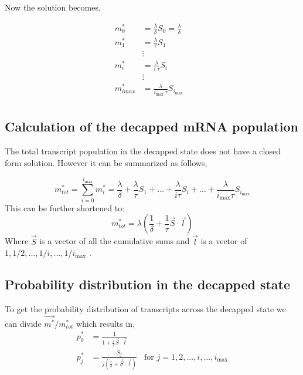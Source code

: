 \documentclass[review]{elsarticle}
\newcommand{\imax}{\ensuremath{i_{\max}}\xspace}
\begin{document}
Now the solution becomes,

\begin{align} \label{eq:decapped_solution} 
m_{0}^{*}  &= \frac{\lambda}{\delta}S_{0}=\frac{\lambda}{\delta} \\ \nonumber
m_{1}^{*}  &= \frac{\lambda}{\tau}S_{1} \\ \nonumber
& \vdots & \\ \nonumber
m_{i}^{*}  &= \frac{\lambda}{i \: \tau}S_{i}  \\ \nonumber
& \vdots & \\ \nonumber
m_{imax}^{*}  &= \frac{\lambda}{\imax \: \tau}S_{\imax}  \\ \nonumber
\end{align}


\subsection{Calculation of the decapped mRNA population}

The total transcript population in the decapped state does not have a closed form solution. However it can be summarized as follows,

\begin{equation*}
	m_{tot}^{*} = \sum_{i=0}^{\imax} m_{i}^{*} = \frac{\lambda}{\delta} + \frac{\lambda}{\tau}S_{1} + \hdots + \frac{\lambda}{i \tau}S_{i} + \hdots  + \frac{\lambda}{\imax \tau}S_{\imax} 
\end{equation*}
This can be further shortened to:
\begin{equation} \label{eq: marked_total_pop} 
	m_{tot}^{*} = \lambda(\frac{1}{\delta} + \frac{1}{\tau}\vec{S} \cdot \vec{l}	) 
\end{equation}
Where $\vec{S}$ is a vector of all the cumulative sums and $\vec{l}$ is a vector of $1,1/2,...,1/i,...,1/\imax$ . 

\subsection{Probability distribution in the decapped state}

To get the probability distribution of transcripts across the decapped state we can divide $\vec{m^{*}}/m_{tot}^{*}$ which results in,
\begin{align}\label{eq:decapped_distribution}
	p_{0}^{*} &= \frac{1}{1 + \frac{\delta}{\tau}\vec{S} \cdot \vec{l}}	\\
  	p_{j}^{*} &= \frac{S_{j}}{j(\frac{\tau}{\delta} + \vec{S} \cdot \vec{l})}	\:\:\:\: \text{for } j=1, 2, ..., i, ..., \imax
\end{align}
\end{document}

